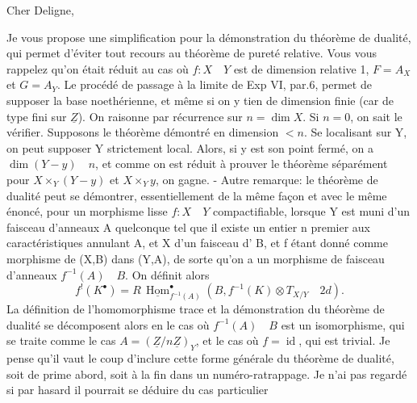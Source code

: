 
Cher Deligne,

Je vous propose une simplification pour la démonstration du théorème de dualité, qui permet d'éviter tout recours au théorème de pureté relative. Vous vous rappelez qu'on était réduit au cas où $f:X\quad Y$ est de dimension relative 1, $F=A_X$ et $G=A_Y$. Le procédé de passage à la limite de Exp VI, par.6, permet de supposer la base noethérienne, et même si on y tien de dimension finie (car de type fini sur $\underline Z$). On raisonne par récurrence sur $n=\dim X$. Si $n=0$, on sait le vérifier. Supposons le théorème démontré en dimension $<n$. Se localisant sur Y, on peut supposer Y strictement local. Alors, si y est son point fermé, on a $\dim(Y-y)\quad n$, et comme on est réduit à prouver le théorème séparément pour $X\times_Y(Y-y)$ et $X\times_Y y$, on gagne. - Autre remarque: le théorème de dualité peut se démontrer, essentiellement de la même façon et avec le même énoncé, pour un morphisme lisse $f:X\quad Y$ compactifiable, lorsque Y est muni d'un faisceau d'anneaux A quelconque tel que il existe un entier n premier aux caractéristiques  annulant A, et X d'un faisceau d' B, et f étant donné comme morphisme de (X,B) dans (Y,A), de sorte qu'on a un morphisme de faisceau d'anneaux $f^{-1}(A)\quad B$. On définit alors
\[
f^{!}(K^{\bullet})=R\,\underline{\operatorname{Hom}}^{\bullet}_{f^{-1}(A)}(B,f^{-1}(K)\otimes T_{X/Y}\quad 2d).
\]
La définition de l'homomorphisme trace et la démonstration du théorème de dualité se décomposent alors en le cas où $f^{-1}(A)\quad B$ est un isomorphisme, qui se traite comme le cas $A=(\underline Z/n\underline Z)_Y$, et le cas où $f=\operatorname{id}$, qui est trivial. Je pense qu'il vaut le coup d'inclure cette forme générale du théorème de dualité, soit de prime abord, soit à la fin dans un numéro-ratrappage. Je n'ai pas regardé si par hasard il pourrait se déduire du cas particulier
